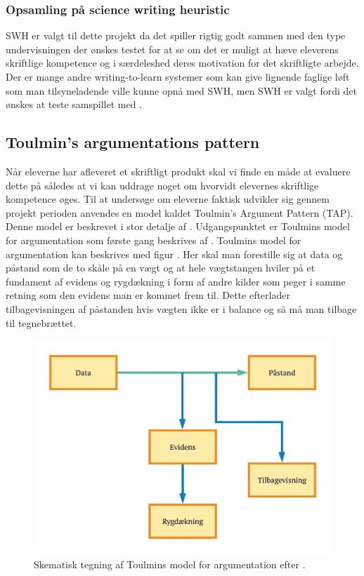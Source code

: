 \subsubsection*{Opsamling på science writing heuristic}
SWH er valgt til dette projekt da det spiller rigtig godt sammen med den type undervisningen der ønskes testet for at se om det er muligt at hæve eleverens skriftlige kompetence og i særdeleshed deres motivation for det skriftligte arbejde. Der er mange andre writing-to-learn systemer som kan give lignende faglige løft som man tilsyneladende ville kunne opnå med SWH, men SWH er valgt fordi det ønskes at teste samspillet med \ib{}.

\subsection*{Toulmin's argumentations pattern}
Når eleverne har afleveret et skriftligt produkt skal vi finde en måde at evaluere dette på således at vi kan uddrage noget om hvorvidt elevernes skriftlige kompetence øges. Til at undersøge om eleverne faktisk udvikler sig gennem projekt perioden anvendes en model kaldet Toulmin's Argument Pattern (TAP). Denne model er beskrevet i stor detalje af \citet{Erduran2004}. Udgangspunktet er Toulmins model for argumentation som første gang beskrives af \citep{Toulmin1958}. Toulmins model for argumentation kan beskrives med figur . Her skal man forestille sig at data og påstand som de to skåle på en vægt og at hele vægtstangen hviler på et fundament af evidens og rygdækning i form af andre kilder som peger i samme retning som den evidens man er kommet frem til. Dette efterlader tilbagevisningen af påstanden hvis vægten ikke er i balance og så må man tilbage til tegnebrættet. 
\begin{figure}
	\centering
	\includegraphics[width=.75\textwidth]{Figs/Toulmin}
	\caption[Toulmin's Argumentations Princip]{Skematisk tegning af Toulmins model for argumentation efter \citet{Toulmin1958}.}
	\label{fig:tou}
\end{figure}

